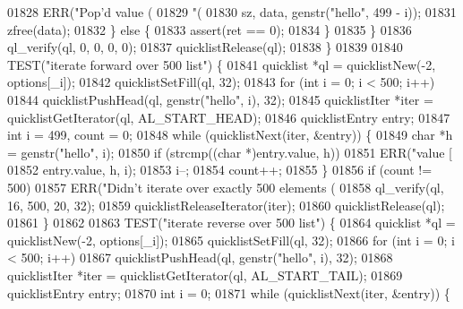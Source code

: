 \begin{DoxyCode}
{{{{{{{{{{{{{{{{{{{{{{{{{{{{{{{{{{{{{{{{{{{01828                         ERR(\textcolor{stringliteral}{"Pop'd value (%
01829                             \textcolor{stringliteral}{"(%
01830                             sz, data, genstr(\textcolor{stringliteral}{"hello"}, 499 - i));
01831                     zfree(data);
01832                 \} \textcolor{keywordflow}{else} \{
01833                     assert(ret == 0);
01834                 \}
01835             \}
01836             ql\_verify(ql, 0, 0, 0, 0);
01837             quicklistRelease(ql);
01838         \}
01839 
01840         TEST(\textcolor{stringliteral}{"iterate forward over 500 list"}) \{
01841             quicklist *ql = quicklistNew(-2, options[\_i]);
01842             quicklistSetFill(ql, 32);
01843             \textcolor{keywordflow}{for} (\textcolor{keywordtype}{int} i = 0; i < 500; i++)
01844                 quicklistPushHead(ql, genstr(\textcolor{stringliteral}{"hello"}, i), 32);
01845             quicklistIter *iter = quicklistGetIterator(ql, AL\_START\_HEAD);
01846             quicklistEntry entry;
01847             \textcolor{keywordtype}{int} i = 499, count = 0;
01848             \textcolor{keywordflow}{while} (quicklistNext(iter, &entry)) \{
01849                 \textcolor{keywordtype}{char} *h = genstr(\textcolor{stringliteral}{"hello"}, i);
01850                 \textcolor{keywordflow}{if} (strcmp((\textcolor{keywordtype}{char} *)entry.value, h))
01851                     ERR(\textcolor{stringliteral}{"value [%
01852                         entry.value, h, i);
01853                 i--;
01854                 count++;
01855             \}
01856             \textcolor{keywordflow}{if} (count != 500)
01857                 ERR(\textcolor{stringliteral}{"Didn't iterate over exactly 500 elements (%
01858             ql\_verify(ql, 16, 500, 20, 32);
01859             quicklistReleaseIterator(iter);
01860             quicklistRelease(ql);
01861         \}
01862 
01863         TEST(\textcolor{stringliteral}{"iterate reverse over 500 list"}) \{
01864             quicklist *ql = quicklistNew(-2, options[\_i]);
01865             quicklistSetFill(ql, 32);
01866             \textcolor{keywordflow}{for} (\textcolor{keywordtype}{int} i = 0; i < 500; i++)
01867                 quicklistPushHead(ql, genstr(\textcolor{stringliteral}{"hello"}, i), 32);
01868             quicklistIter *iter = quicklistGetIterator(ql, AL\_START\_TAIL);
01869             quicklistEntry entry;
01870             \textcolor{keywordtype}{int} i = 0;
01871             \textcolor{keywordflow}{while} (quicklistNext(iter, &entry)) \{
}}}}}}}}}}}}}}}}}}}}}}}}}}}}}}}}}}}}}}}}}}}}}}}
\end{DoxyCode}
